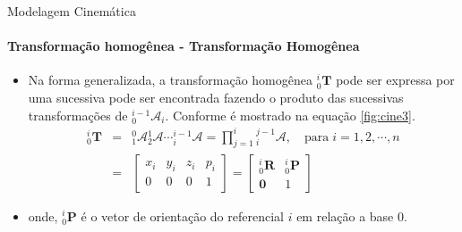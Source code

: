 \documentclass{beamer}
\begin{document}
\begin{frame}{Modelagem Cinemática}
    \framesubtitle{Transformação homogênea - Transformação Homogênea}
    \begin{itemize}
        \item Na forma generalizada, a transformação homogênea ${}^{i}_0\mathbf{T}$ pode ser expressa por uma sucessiva pode ser encontrada fazendo o produto das sucessivas transformações de ${}^{i-1}_0\mathcal{A}_i$. Conforme é mostrado na equação \eqref{fig:cine3}.
              \begin{equation}\label{fig:cine3}
                  \begin{array}{lcl}
                      {}^i_0\mathbf{T} & = & {}^0_1\mathcal{A}{}^1_2\mathcal{A} \cdots {}^{i-1}_i\mathcal{A} = \prod \limits^i_{j=1}{}^{j-1}_i\mathcal{A}, \quad \mathrm{para\;}i=1,2,\cdots,n \\[.2cm]
                                       & = &
                      \begin{bmatrix}
                          x_i & y_i & z_i & p_i \\
                          0   & 0   & 0   & 1
                      \end{bmatrix} =
                      \begin{bmatrix}
                          {}^i_0\mathbf{R} & {}^i_0\mathbf{P} \\
                          \mathbf{0}       & 1
                      \end{bmatrix}
                  \end{array}
              \end{equation}
        \item onde, ${}^i_0\mathbf{P}$ é o vetor de orientação do referencial $i$ em relação a base $0$.
    \end{itemize}

\end{frame}
\end{document}
